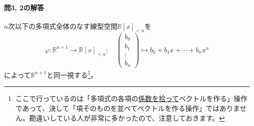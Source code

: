 \paragraph{問3, 2の解答} $n$次以下の多項式全体のなす線型空間$\mathbb{R}[x]_{<n}$を
\[
\varphi\colon \mathbb{R}^{n + 1} \rightarrow \mathbb{R}[x]_{<n}; \quad
\begin{pmatrix}
b_0 \\
b_1 \\
\vdots \\
b_n
\end{pmatrix}
\mapsto b_0 + b_1 x + \cdots + b_n x^n
\]
によって$\mathbb{R}^{n + 1}$と同一視する\footnote{ここで行っているのは「多項式の各項の\uline{係数を拾って}ベクトルを作る」操作であって、決して「項そのものを並べてベクトルを作る操作」ではありません。勘違いしている人が非常に多かったので、注意しておきます。}。

